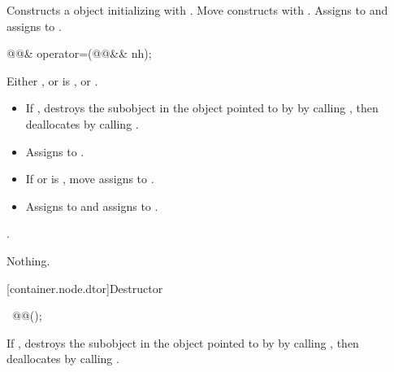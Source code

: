 \begin{itemdescr}
\pnum
\effects Constructs a  object initializing
 with .  Move constructs  with
.  Assigns  to  and assigns
 to .
\end{itemdescr}

\begin{itemdecl}
@@& operator=(@@&& nh);
\end{itemdecl}

\begin{itemdescr}
\pnum
\requires Either , or
is , or .

\pnum
\effects
\begin{itemize}
\item
If , destroys the 
subobject in the  object pointed to by 
by calling , then deallocates  by
calling .
\item
Assigns  to .
\item
If  or 
is , move assigns  to .
\item
Assigns
 to  and assigns  to
.
\end{itemize}

\pnum \returns {}.

\pnum \throws Nothing.
\end{itemdescr}

[container.node.dtor]{Destructor}

\begin{itemdecl}
~@@();
\end{itemdecl}

\begin{itemdescr}
\pnum
\effects If , destroys the  subobject
in the  object pointed to by  by calling
, then deallocates  by calling
.
\end{itemdescr}

